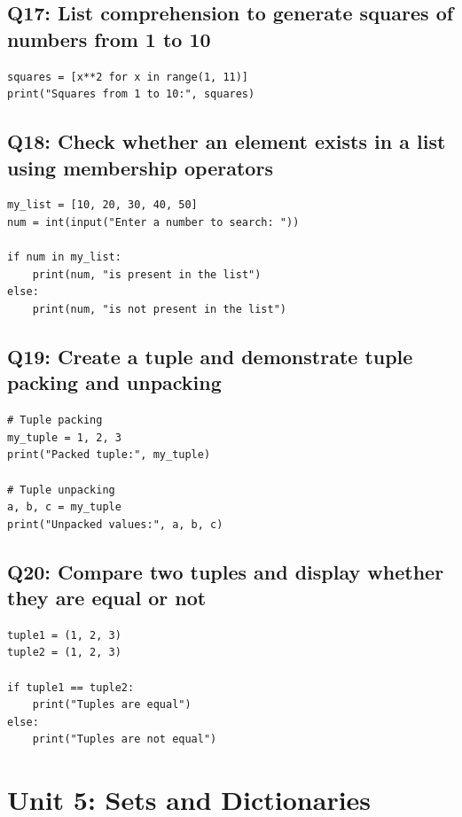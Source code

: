 \documentclass[11pt,a4paper]{article}
\begin{document}
\subsection{Q17: List comprehension to generate squares of numbers from 1 to 10}
\begin{lstlisting}
squares = [x**2 for x in range(1, 11)]
print("Squares from 1 to 10:", squares)
\end{lstlisting}

\subsection{Q18: Check whether an element exists in a list using membership operators}
\begin{lstlisting}
my_list = [10, 20, 30, 40, 50]
num = int(input("Enter a number to search: "))

if num in my_list:
    print(num, "is present in the list")
else:
    print(num, "is not present in the list")
\end{lstlisting}

\subsection{Q19: Create a tuple and demonstrate tuple packing and unpacking}
\begin{lstlisting}
# Tuple packing
my_tuple = 1, 2, 3
print("Packed tuple:", my_tuple)

# Tuple unpacking
a, b, c = my_tuple
print("Unpacked values:", a, b, c)
\end{lstlisting}

\subsection{Q20: Compare two tuples and display whether they are equal or not}
\begin{lstlisting}
tuple1 = (1, 2, 3)
tuple2 = (1, 2, 3)

if tuple1 == tuple2:
    print("Tuples are equal")
else:
    print("Tuples are not equal")
\end{lstlisting}

\section{Unit 5: Sets and Dictionaries}
\end{document}
